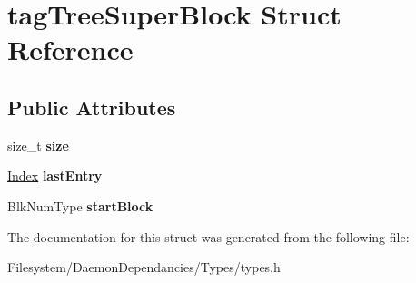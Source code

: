 \hypertarget{structtagTreeSuperBlock}{}\section{tag\+Tree\+Super\+Block Struct Reference}
\label{structtagTreeSuperBlock}
\subsection*{Public Attributes}
\begin{DoxyCompactItemize}
\item 
\mbox{\label{structtagTreeSuperBlock_a5fba4a1328640e6b41f4c3e8ca7ee804}} 
size\+\_\+t {\bfseries size}
\item 
\mbox{\label{structtagTreeSuperBlock_ac2492d025873ac0d95921ee91acabe51}} 
\mbox{\hyperlink{structindex}{Index}} {\bfseries last\+Entry}
\item 
\mbox{\label{structtagTreeSuperBlock_ad7f50abf9a6efeee63037e73d0c349d9}} 
Blk\+Num\+Type {\bfseries start\+Block}
\end{DoxyCompactItemize}


The documentation for this struct was generated from the following file\+:\begin{DoxyCompactItemize}
\item 
Filesystem/\+Daemon\+Dependancies/\+Types/types.\+h\end{DoxyCompactItemize}
